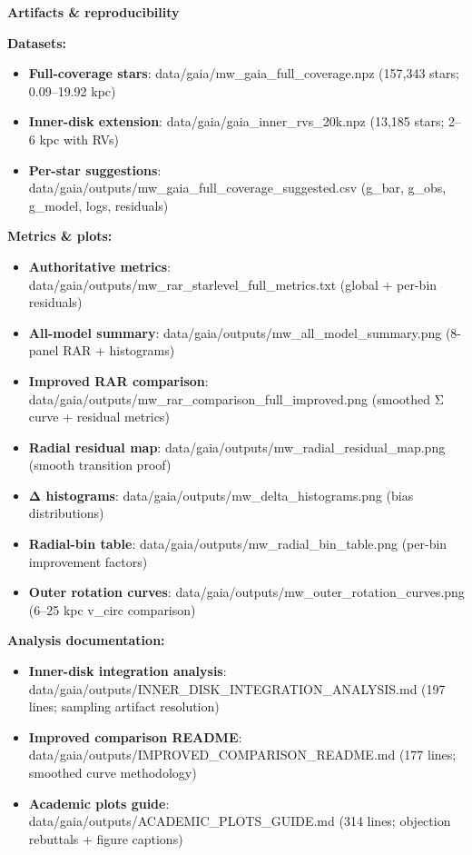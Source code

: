 \documentclass[11pt,a4paper]{article}
\begin{document}
\textbf{Artifacts \& reproducibility}


\textbf{Datasets:}

\begin{itemize}
\item \textbf{Full-coverage stars}: data/gaia/mw\_gaia\_full\_coverage.npz (157,343 stars; 0.09–19.92 kpc)
\item \textbf{Inner-disk extension}: data/gaia/gaia\_inner\_rvs\_20k.npz (13,185 stars; 2–6 kpc with RVs)
\item \textbf{Per-star suggestions}: data/gaia/outputs/mw\_gaia\_full\_coverage\_suggested.csv (g\_bar, g\_obs, g\_model, logs, residuals)
\end{itemize}


\textbf{Metrics \& plots:}

\begin{itemize}
\item \textbf{Authoritative metrics}: data/gaia/outputs/mw\_rar\_starlevel\_full\_metrics.txt (global + per-bin residuals)
\item \textbf{All-model summary}: data/gaia/outputs/mw\_all\_model\_summary.png (8-panel RAR + histograms)
\item \textbf{Improved RAR comparison}: data/gaia/outputs/mw\_rar\_comparison\_full\_improved.png (smoothed Σ curve + residual metrics)
\item \textbf{Radial residual map}: data/gaia/outputs/mw\_radial\_residual\_map.png (smooth transition proof)
\item \textbf{Δ histograms}: data/gaia/outputs/mw\_delta\_histograms.png (bias distributions)
\item \textbf{Radial-bin table}: data/gaia/outputs/mw\_radial\_bin\_table.png (per-bin improvement factors)
\item \textbf{Outer rotation curves}: data/gaia/outputs/mw\_outer\_rotation\_curves.png (6–25 kpc v\_circ comparison)
\end{itemize}


\textbf{Analysis documentation:}

\begin{itemize}
\item \textbf{Inner-disk integration analysis}: data/gaia/outputs/INNER\_DISK\_INTEGRATION\_ANALYSIS.md (197 lines; sampling artifact resolution)
\item \textbf{Improved comparison README}: data/gaia/outputs/IMPROVED\_COMPARISON\_README.md (177 lines; smoothed curve methodology)
\item \textbf{Academic plots guide}: data/gaia/outputs/ACADEMIC\_PLOTS\_GUIDE.md (314 lines; objection rebuttals + figure captions)
\end{itemize}
\end{document}
